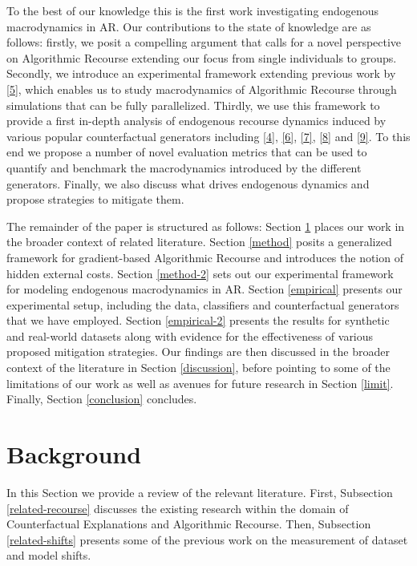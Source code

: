 \documentclass[conference,final,]{IEEEtran}
\theoremstyle{definition}
\theoremstyle{definition}
\theoremstyle{definition}
\theoremstyle{definition}
\theoremstyle{remark}
\begin{document}
To the best of our knowledge this is the first work investigating endogenous macrodynamics in AR. Our contributions to the state of knowledge are as follows: firstly, we posit a compelling argument that calls for a novel perspective on Algorithmic Recourse extending our focus from single individuals to groups. Secondly, we introduce an experimental framework extending previous work by \protect\hyperlink{ref-altmeyer2022CounterfactualExplanations}{{[}5{]}}, which enables us to study macrodynamics of Algorithmic Recourse through simulations that can be fully parallelized. Thirdly, we use this framework to provide a first in-depth analysis of endogenous recourse dynamics induced by various popular counterfactual generators including \protect\hyperlink{ref-wachter2017counterfactual}{{[}4{]}}, \protect\hyperlink{ref-schut2021generating}{{[}6{]}}, \protect\hyperlink{ref-joshi2019towards}{{[}7{]}}, \protect\hyperlink{ref-mothilal2020explaining}{{[}8{]}} and \protect\hyperlink{ref-antoran2020getting}{{[}9{]}}. To this end we propose a number of novel evaluation metrics that can be used to quantify and benchmark the macrodynamics introduced by the different generators. Finally, we also discuss what drives endogenous dynamics and propose strategies to mitigate them.

The remainder of the paper is structured as follows: Section \ref{related} places our work in the broader context of related literature. Section \ref{method} posits a generalized framework for gradient-based Algorithmic Recourse and introduces the notion of hidden external costs. Section \ref{method-2} sets out our experimental framework for modeling endogenous macrodynamics in AR. Section \ref{empirical} presents our experimental setup, including the data, classifiers and counterfactual generators that we have employed. Section \ref{empirical-2} presents the results for synthetic and real-world datasets along with evidence for the effectiveness of various proposed mitigation strategies. Our findings are then discussed in the broader context of the literature in Section \ref{discussion}, before pointing to some of the limitations of our work as well as avenues for future research in Section \ref{limit}. Finally, Section \ref{conclusion} concludes.

\hypertarget{related}{%
\section{Background}\label{related}}

In this Section we provide a review of the relevant literature. First, Subsection \ref{related-recourse} discusses the existing research within the domain of Counterfactual Explanations and Algorithmic Recourse. Then, Subsection \ref{related-shifts} presents some of the previous work on the measurement of dataset and model shifts.
\end{document}
